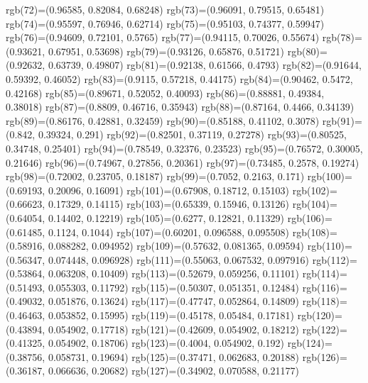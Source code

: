 {{rgb(72)=(0.96585, 0.82084, 0.68248)
rgb(73)=(0.96091, 0.79515, 0.65481)
rgb(74)=(0.95597, 0.76946, 0.62714)
rgb(75)=(0.95103, 0.74377, 0.59947)
rgb(76)=(0.94609, 0.72101, 0.5765)
rgb(77)=(0.94115, 0.70026, 0.55674)
rgb(78)=(0.93621, 0.67951, 0.53698)
rgb(79)=(0.93126, 0.65876, 0.51721)
rgb(80)=(0.92632, 0.63739, 0.49807)
rgb(81)=(0.92138, 0.61566, 0.4793)
rgb(82)=(0.91644, 0.59392, 0.46052)
rgb(83)=(0.9115, 0.57218, 0.44175)
rgb(84)=(0.90462, 0.5472, 0.42168)
rgb(85)=(0.89671, 0.52052, 0.40093)
rgb(86)=(0.88881, 0.49384, 0.38018)
rgb(87)=(0.8809, 0.46716, 0.35943)
rgb(88)=(0.87164, 0.4466, 0.34139)
rgb(89)=(0.86176, 0.42881, 0.32459)
rgb(90)=(0.85188, 0.41102, 0.3078)
rgb(91)=(0.842, 0.39324, 0.291)
rgb(92)=(0.82501, 0.37119, 0.27278)
rgb(93)=(0.80525, 0.34748, 0.25401)
rgb(94)=(0.78549, 0.32376, 0.23523)
rgb(95)=(0.76572, 0.30005, 0.21646)
rgb(96)=(0.74967, 0.27856, 0.20361)
rgb(97)=(0.73485, 0.2578, 0.19274)
rgb(98)=(0.72002, 0.23705, 0.18187)
rgb(99)=(0.7052, 0.2163, 0.171)
rgb(100)=(0.69193, 0.20096, 0.16091)
rgb(101)=(0.67908, 0.18712, 0.15103)
rgb(102)=(0.66623, 0.17329, 0.14115)
rgb(103)=(0.65339, 0.15946, 0.13126)
rgb(104)=(0.64054, 0.14402, 0.12219)
rgb(105)=(0.6277, 0.12821, 0.11329)
rgb(106)=(0.61485, 0.1124, 0.1044)
rgb(107)=(0.60201, 0.096588, 0.095508)
rgb(108)=(0.58916, 0.088282, 0.094952)
rgb(109)=(0.57632, 0.081365, 0.09594)
rgb(110)=(0.56347, 0.074448, 0.096928)
rgb(111)=(0.55063, 0.067532, 0.097916)
rgb(112)=(0.53864, 0.063208, 0.10409)
rgb(113)=(0.52679, 0.059256, 0.11101)
rgb(114)=(0.51493, 0.055303, 0.11792)
rgb(115)=(0.50307, 0.051351, 0.12484)
rgb(116)=(0.49032, 0.051876, 0.13624)
rgb(117)=(0.47747, 0.052864, 0.14809)
rgb(118)=(0.46463, 0.053852, 0.15995)
rgb(119)=(0.45178, 0.05484, 0.17181)
rgb(120)=(0.43894, 0.054902, 0.17718)
rgb(121)=(0.42609, 0.054902, 0.18212)
rgb(122)=(0.41325, 0.054902, 0.18706)
rgb(123)=(0.4004, 0.054902, 0.192)
rgb(124)=(0.38756, 0.058731, 0.19694)
rgb(125)=(0.37471, 0.062683, 0.20188)
rgb(126)=(0.36187, 0.066636, 0.20682)
rgb(127)=(0.34902, 0.070588, 0.21177)
}}